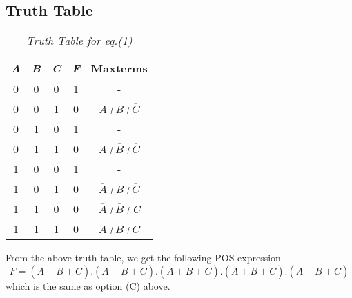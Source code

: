 \documentclass{article}
\begin{document}
\subsection{Truth Table}
\begin{table}[h]
\centering
\begin{tabular}{|c|c|c|c|c|}
\hline
\textit{\textbf{A}} & \textit{\textbf{B}} & \textit{\textbf{C}} & \textit{\textbf{F}} & \textbf{Maxterms}                                     \\ \hline
0                   & 0                   & 0                   & 1                   & -                                                     \\
0                   & 0                   & 1                   & 0                   & \textit{A+B+$\overline{C}$}                           \\
0                   & 1                   & 0                   & 1                   & -                                                     \\
0                   & 1                   & 1                   & 0                   & \textit{A+$\overline{B}$+$\overline{C}$}              \\
1                   & 0                   & 0                   & 1                   & -                                                     \\
1                   & 0                   & 1                   & 0                   & \textit{$\overline{A}$+B+$\overline{C}$}              \\
1                   & 1                   & 0                   & 0                   & \textit{$\overline{A}$+$\overline{B}$+C}              \\
1                   & 1                   & 1                   & 0                   & \textit{$\overline{A}$+$\overline{B}$+$\overline{C}$} \\ \hline
\end{tabular}
\caption{\textit{Truth Table for eq.(1)}}
\label{tab:my-table}
\end{table}

From the above truth table, we get the following POS expression
\begin{equation}
    F=(A+B+\overline{C}).(A+\overline{B}+\overline{C}).(\overline{A}+B+\overline{C}).(\overline{A}+\overline{B}+C).(\overline{A}+\overline{B}+\overline{C})
\end{equation}
which is the same as option (C) above.
\end{document}

